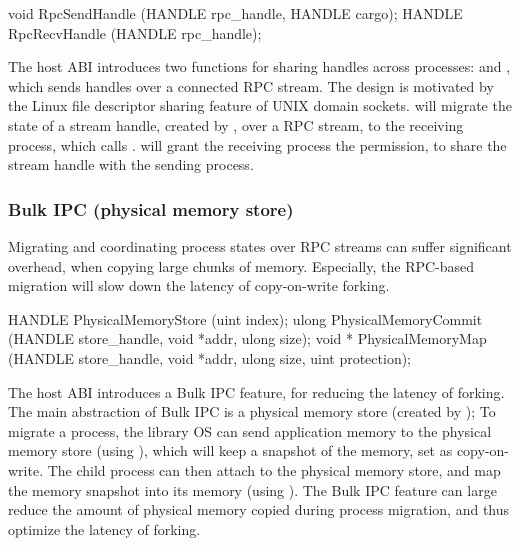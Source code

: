 \begin{paldef}
void   RpcSendHandle (HANDLE rpc_handle, HANDLE cargo);
HANDLE RpcRecvHandle (HANDLE rpc_handle);
\end{paldef}



The host ABI introduces two functions for sharing handles across processes:  and , which sends handles over a connected RPC stream.
The design is motivated by the Linux file descriptor sharing feature of UNIX domain sockets.
 will migrate the state of a stream handle, created by ,
over a RPC stream, to the receiving process, which calls .
 will grant the receiving process the permission, to share the stream handle with the sending process.


\subsubsection*{Bulk IPC (physical memory store)}


Migrating and coordinating process states over RPC streams
can suffer significant overhead, when copying large chunks of memory.
Especially, the RPC-based migration will slow down the latency of copy-on-write forking.

\begin{paldef}
HANDLE PhysicalMemoryStore  (uint index);
ulong  PhysicalMemoryCommit (HANDLE store_handle,
                             void *addr, ulong size);
void * PhysicalMemoryMap    (HANDLE store_handle,
                             void *addr, ulong size,
                             uint protection);
\end{paldef}


The host ABI introduces a Bulk IPC feature, for reducing the latency of forking.
The main abstraction of Bulk IPC
is a physical memory store (created by );
To migrate a process, the library OS
can send application memory to the physical memory store (using ), which will keep a snapshot of the memory, set as copy-on-write.
The child process can then attach to the physical memory store,
and map the memory snapshot into its memory (using ).
The Bulk IPC feature can large reduce the amount of physical memory copied during process migration,
and thus optimize the latency of forking.




